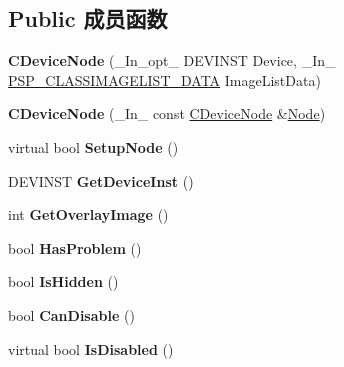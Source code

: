 \subsection*{Public 成员函数}
\begin{DoxyCompactItemize}
\item 
\mbox{\label{class_c_device_node_ae5d638659194bfe2a06a625c31a6263c}} 
{\bfseries C\+Device\+Node} (\+\_\+\+In\+\_\+opt\+\_\+ D\+E\+V\+I\+N\+ST Device, \+\_\+\+In\+\_\+ \hyperlink{struct___s_p___c_l_a_s_s_i_m_a_g_e_l_i_s_t___d_a_t_a}{P\+S\+P\+\_\+\+C\+L\+A\+S\+S\+I\+M\+A\+G\+E\+L\+I\+S\+T\+\_\+\+D\+A\+TA} Image\+List\+Data)
\item 
\mbox{\label{class_c_device_node_a6b5e289280c2483ca986f980e2cc53a6}} 
{\bfseries C\+Device\+Node} (\+\_\+\+In\+\_\+ const \hyperlink{class_c_device_node}{C\+Device\+Node} \&\hyperlink{uniongl__dlist__node}{Node})
\item 
\mbox{\label{class_c_device_node_aaa87015545cbe3b38e8c673621036b5c}} 
virtual bool {\bfseries Setup\+Node} ()
\item 
\mbox{\label{class_c_device_node_a68ce1db4d23766fdaf717bd33ab915b9}} 
D\+E\+V\+I\+N\+ST {\bfseries Get\+Device\+Inst} ()
\item 
\mbox{\label{class_c_device_node_a22b4006be37e6fc5947d7171fecf22aa}} 
int {\bfseries Get\+Overlay\+Image} ()
\item 
\mbox{\label{class_c_device_node_a35ce64df497a4fcf682d7bbc2b36e7e4}} 
bool {\bfseries Has\+Problem} ()
\item 
\mbox{\label{class_c_device_node_a3c998a0a221759c4d97e88ae9403312d}} 
bool {\bfseries Is\+Hidden} ()
\item 
\mbox{\label{class_c_device_node_a8ed8aaa76ba2a2a4abd05a5349e5a9aa}} 
bool {\bfseries Can\+Disable} ()
\item 
\mbox{\label{class_c_device_node_a8cfab86b1934344779a695002751bcdf}} 
virtual bool {\bfseries Is\+Disabled} ()
\item 

\end{DoxyCompactItemize}
